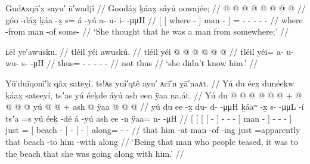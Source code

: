 \ex\label{ex:89-165-she-thought-man-from-somewhere}%
%
\begingl
	\glpreamble	Gudᴀxqā′x sayu′ ū′wadjî //
	\glpreamble	Goodáx̱ ḵáax̱ sáyú oowajée; //
	\gla	{} {}  @ {} {}  @ {} {}  @ {} @ {} 
		 @ {} @ {} @ {} @ {} //
	\glb	{} {} góo -dáx̱ {} ḵáa -x̱ {} s= á -yú
		a- u- i-  -μμH //
	\glc	{}[\pr{PP} {}[ where - {}] man - {}] =  -
		- - -  - //
	\gld	{} {} where -from {} man -of {} some-  {}
		 {} {} {} {} //
	\glft	‘She thought that he was a man from somewhere;’
		//
\endgl
\xe

\ex\label{ex:89-166-she-didnt-know}%
%
\begingl
	\glpreamble	ʟēł ye′awusku. //
	\glpreamble	tléil yéi awuskú. //
	\gla	tléil yéi @  @ {} @ {} @ {} @ {} @ {} //
	\glb	tléil yéi= a- u- wu- s-  -μH //
	\glc	{} thus= - - - -  - //
	\gld	not thus  {} {} {} {} {} //
	\glft	‘she didn’t know him.’
		//
\endgl
\xe

\ex\label{ex:89-167-man-people-teased-with-him-to-beach}%
%
\begingl
	\glpreamble	Yū′duīqonī′k qāx sateỵî, ts!ᴀs yuî′qtê ayu′ ᴀcī′n ỵā′naᴀt. //
	\glpreamble	Yú du éex̱ dunéekw ḵáax̱ sateeyí, tsʼas yú éeḵde áyú ash een ÿaa na.át. //
	\gla	{} {} Yú {} {} du  @ {} {}
					 @ {} @ {} @ {} @ {} {} 
				 @ {} {} +
			 @ {} @ {} @ {} {}
		 @ {} {} yú  @ {} {}  @ {} +
		{} ash  @ {} {}
		ÿaa @  @ {} @ {} //
	\glb	{} {} yú {} {} du ee -x̱ {} 
					du- d-  -μμH {} {}
				ḵáaʷ -x̱ {}
			s-  -μμL -í {}
		tsʼa =s {} yú éeḵ -dé {} á -yú
		{} ash ee -n {}
		ÿaa= n-  -μH //
	\glc	{}[ {}[  {}[ {}[   - {}]
					- -  - \· {}]
				man - {}]
			-  - - {}]
		just = {}[  beach - {}]  -
		{}[   - {}]
		along= -  - //
	\gld	{} {} that {} {} him {} -at {}
					 {} {} {} {} {}
				man -of {}
			 {} {} -ing {}
		just =apparently {} that beach -to {}  {}
		{} him {} -with {}
		along  {} {} //
	\glft	‘Being that man who people teased, it was to the beach that she was going along with him.’
		//
\endgl
\xe

